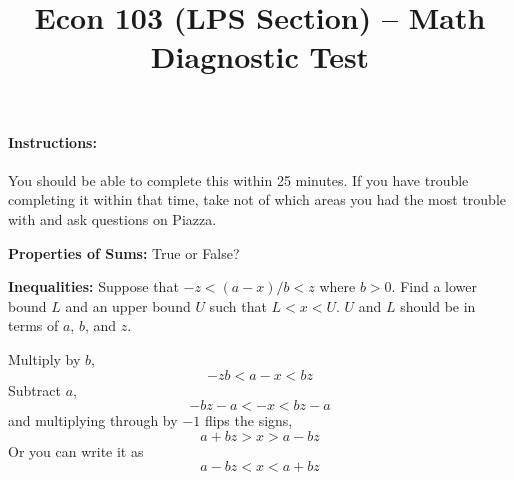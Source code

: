 \documentclass[12pt]{exam}
\title{Econ 103 (LPS Section) -- Math Diagnostic Test}
\date{}
\author{}
\begin{document}
\maketitle

\paragraph{Instructions:} You should be able to complete this within 25 minutes. If you have trouble completing it within that time, take not of which areas you had the most trouble with and ask questions on Piazza. 

\begin{questions}

\question \textbf{Properties of Sums:} True or False?
	
\question \textbf{Inequalities:} Suppose that $-z < (a - x)/b < z$ where $b>0$. Find a lower bound $L$ and an upper bound $U$ such that $L < x < U$. $U$ and $L$ should be in terms of $a$, $b$, and $z$.
			\begin{solution}[1.5in]
                   Multiply by $b$,
                   $$-zb < a - x < bz$$				
				Subtract $a$, 
					$$-bz - a < -x < bz - a$$
				and multiplying through by $-1$ flips the signs,
					$$a + bz > x > a - bz$$
				Or you can write it as 
				    $$ a - bz < x < a + bz$$
			\end{solution}


\end{questions}
\end{document}
